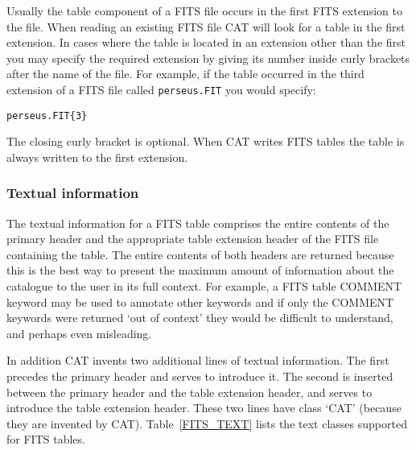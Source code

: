 Usually the table component of a FITS file occurs in the first FITS
extension to the file. When reading an existing FITS file CAT will look
for a table in the first extension. In cases where the table is located
in an extension other than the first you may specify the required 
extension by giving its number inside curly brackets after the name
of the file. For example, if the table occurred in the third extension
of a FITS file called {\tt perseus.FIT} you would specify:

\begin{verbatim}
perseus.FIT{3}
\end{verbatim}

The closing curly bracket is optional. When CAT writes FITS tables
the table is always written to the first extension.

\subsubsection{Textual information}

The textual information for a FITS table comprises the entire contents
of the primary header and the appropriate table extension header of the
FITS file containing the table. The entire contents of both headers are
returned because this is the best way to present the maximum amount of
information about the catalogue to the user in its full context. For
example, a FITS table COMMENT keyword may be used to annotate other
keywords and if only the COMMENT keywords were returned `out of context'
they would be difficult to understand, and perhaps even misleading.

In addition CAT invents two additional lines of textual information.
The first precedes the primary header and serves to introduce it. The
second is inserted between the primary header and the table extension
header, and serves to introduce the table extension header. These two
lines have class `CAT' (because they are invented by CAT). 
Table~\ref{FITS_TEXT} lists the text classes supported for FITS
tables. 

